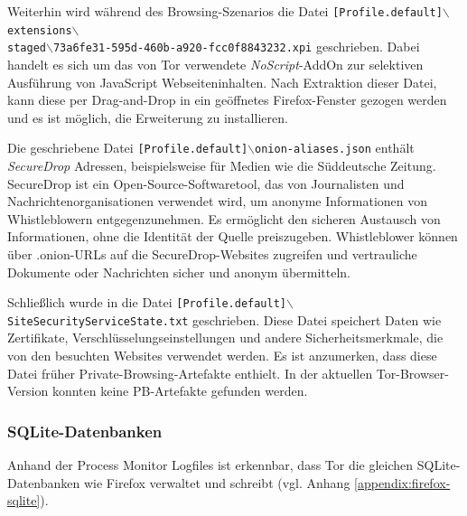 \begin{appendices}
Weiterhin wird während des Browsing-Szenarios die Datei \texttt{[Profile.default]$\backslash$extensions$\backslash$\\staged$\backslash${73a6fe31-595d-460b-a920-fcc0f8843232}.xpi} geschrieben. Dabei handelt es sich um das von Tor verwendete \textit{NoScript}-AddOn zur selektiven Ausführung von JavaScript Webseiteninhalten.
Nach Extraktion dieser Datei, kann diese per Drag-and-Drop in ein geöffnetes Firefox-Fenster gezogen werden und es ist möglich, die Erweiterung zu installieren.

Die geschriebene Datei \texttt{[Profile.default]$\backslash$onion-aliases.json} enthält \textit{SecureDrop} Adressen, beispielsweise für Medien wie die Süddeutsche Zeitung. 
SecureDrop ist ein Open-Source-Softwaretool, das von Journalisten und Nachrichtenorganisationen verwendet wird, um anonyme Informationen von Whistleblowern entgegenzunehmen. Es ermöglicht den sicheren Austausch von Informationen, ohne die Identität der Quelle preiszugeben. Whistleblower können über .onion-URLs auf die SecureDrop-Websites zugreifen und vertrauliche Dokumente oder Nachrichten sicher und anonym übermitteln. \cite{SecureDrop.05.06.2023}

Schließlich wurde in die Datei \texttt{[Profile.default]$\backslash$SiteSecurityServiceState.txt} geschrieben.
Diese Datei speichert Daten wie Zertifikate, Verschlüsselungseinstellungen und andere Sicherheitsmerkmale, die von den besuchten Websites verwendet werden.
Es ist anzumerken, dass diese Datei früher Private-Browsing-Artefakte enthielt. \cite{Gitlab.05.06.2023} In der aktuellen Tor-Browser-Version konnten keine PB-Artefakte gefunden werden.
	
\subsubsection*{SQLite-Datenbanken} 
Anhand der Process Monitor Logfiles ist erkennbar, dass Tor die gleichen SQLite-Datenbanken wie Firefox verwaltet und schreibt (vgl. Anhang \ref{appendix:firefox-sqlite}).
			

\end{appendices}
